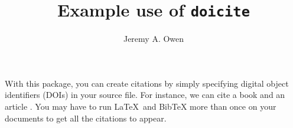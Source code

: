 \documentclass{article}
\title{Example use of \texttt{doicite}}
\author{Jeremy A. Owen}
\begin{document}
\maketitle

With this package, you can create citations by simply specifying digital object identifiers (DOIs) in your source file. For instance, we can cite a book   and an article . You may have to run \LaTeX\ and BibTeX more than once on your documents to get all the citations to appear.



\end{document}
